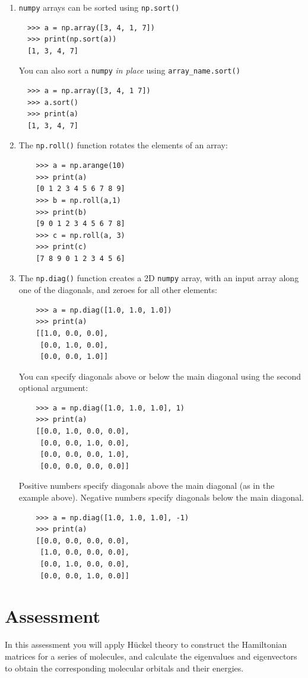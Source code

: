 \documentclass[a4paper]{article}
\begin{document}
\begin{enumerate}
\item
  \texttt{numpy} arrays can be sorted using \texttt{np.sort()}
  \begin{lstlisting}
  >>> a = np.array([3, 4, 1, 7])
  >>> print(np.sort(a))
  [1, 3, 4, 7]
  \end{lstlisting}
  You can also sort a \texttt{numpy} \emph{in place} using \texttt{array\_name.sort()}
  \begin{lstlisting}
  >>> a = np.array([3, 4, 1 7])
  >>> a.sort()
  >>> print(a)
  [1, 3, 4, 7]
  \end{lstlisting}
\item
  The \texttt{np.roll()} function rotates the elements of an array:
    \begin{lstlisting}
    >>> a = np.arange(10)
    >>> print(a)
    [0 1 2 3 4 5 6 7 8 9]
    >>> b = np.roll(a,1)
    >>> print(b)
    [9 0 1 2 3 4 5 6 7 8]
    >>> c = np.roll(a, 3)
    >>> print(c)
    [7 8 9 0 1 2 3 4 5 6]
    \end{lstlisting}
  \item
    The \texttt{np.diag()} function creates a 2D \texttt{numpy} array, with an input array along one of the diagonals, and zeroes for all other elements:
    \begin{lstlisting}
    >>> a = np.diag([1.0, 1.0, 1.0])
    >>> print(a)
    [[1.0, 0.0, 0.0],
     [0.0, 1.0, 0.0],
     [0.0, 0.0, 1.0]]
    \end{lstlisting}
    You can specify diagonals above or below the main diagonal using the second optional argument:
    \begin{lstlisting}
    >>> a = np.diag([1.0, 1.0, 1.0], 1)
    >>> print(a)
    [[0.0, 1.0, 0.0, 0.0],
     [0.0, 0.0, 1.0, 0.0],
     [0.0, 0.0, 0.0, 1.0],
     [0.0, 0.0, 0.0, 0.0]]
    \end{lstlisting}
    Positive numbers specify diagonals above the main diagonal (as in the example above). Negative numbers specify diagonals below the main diagonal.
    \begin{lstlisting}
    >>> a = np.diag([1.0, 1.0, 1.0], -1)
    >>> print(a)
    [[0.0, 0.0, 0.0, 0.0],
     [1.0, 0.0, 0.0, 0.0],
     [0.0, 1.0, 0.0, 0.0],
     [0.0, 0.0, 1.0, 0.0]]
    \end{lstlisting}
\end{enumerate}

\pagebreak

\section*{Assessment}
In this assessment you will apply H\"{u}ckel theory to construct the Hamiltonian matrices for a series of molecules, and calculate the eigenvalues and eigenvectors to obtain the corresponding molecular orbitals and their energies.
\end{document}

